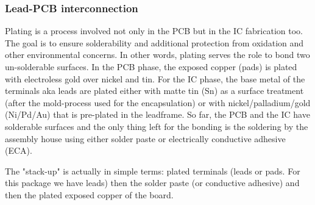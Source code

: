 \documentclass[final]{cubedoc}
\begin{document}
	
	\subsubsection{Lead-PCB interconnection}
	
	
	Plating is a process involved not only in the PCB but in the IC fabrication too. The goal is to ensure solderability and additional protection from oxidation and other environmental concerns. In other words, plating serves the role to bond two un-solderable surfaces. In the PCB phase, the exposed copper (pads) is plated with electroless gold over nickel and tin. For the IC phase, the base metal of the terminals aka leads are plated either with matte tin (Sn) as a surface treatment (after the mold-process used for the encapsulation) or with  nickel/palladium/gold (Ni/Pd/Au) that is pre-plated in the leadframe. So far, the PCB and the IC have solderable surfaces and the only thing left for the bonding is the soldering by the assembly house using either solder paste or electrically conductive adhesive (ECA).  
	
	
	The "stack-up" is actually in simple terms: plated terminals (leads or pads. For this package we have leads) then the solder paste (or conductive adhesive) and then the plated exposed copper of the board. 
	
\end{document}
